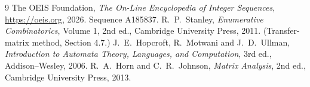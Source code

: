 \documentclass[11pt,a4paper]{article}
\theoremstyle{plain}
\theoremstyle{definition}
\begin{document}
\begin{thebibliography}{9}
 The OEIS Foundation, \emph{The On-Line Encyclopedia of Integer
Sequences}, \url{https://oeis.org}, 2026. Sequence A185837.
 R.~P.~Stanley, \emph{Enumerative Combinatorics}, Volume 1, 2nd ed.,
Cambridge University Press, 2011. (Transfer-matrix method, Section 4.7.)
 J.~E.~Hopcroft, R.~Motwani and J.~D.~Ullman, \emph{Introduction to Automata
Theory, Languages, and Computation}, 3rd ed., Addison--Wesley, 2006.
 R.~A.~Horn and C.~R.~Johnson, \emph{Matrix Analysis}, 2nd ed., Cambridge
University Press, 2013.
\end{thebibliography}
\end{document}
